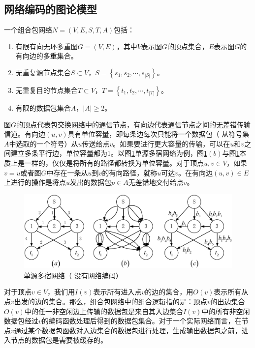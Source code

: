 \subsection{网络编码的图论模型}
一个组合包网络$N=(V,E,S,T,A)$包括：
\begin{enumerate}[fullwidth,itemindent=2em,label=(\arabic*)]
	\item 有限有向无环多重图$G=(V,E)$，其中$V$表示图$G$的顶点集合，$E$表示图$G$的有向边的多重集合。
	\item 无重复源节点集合$S \subset V$，$S = \left\{ {{s_1},{s_2}, \cdots ,{s_{\left| S \right|}}} \right\}$。
	\item 无重复目的节点集合$T \subset V$，$T = \left\{ {{t_1},{t_2}, \cdots ,{t_{\left| T \right|}}} \right\}$。
	\item 有限的数据包集合$A$，$\left| A \right| \ge 2$。
\end{enumerate}
\par
图$G$的顶点代表包交换网络中的通信节点，有向边代表通信节点之间的无差错传输信道。有向边$(u,v)$具有单位容量，即每条边每次只能将一个数据包（ 从符号集$A$中选取的一个符号）从$u$传送给点$v$。如果要进行更大容量的传输，可以在$u$和$v$之间建立多条平行边，单位容量都为1。以图\ref{TULUNMOXING_EPS}单源多宿网络为例，图\ref{TULUNMOXING_EPS}$\left(b\right)$与图\ref{TULUNMOXING_EPS}本质上是一样的，仅仅是将所有的路径都转换为单位容量。对于顶点$u,v \in V$，如果$v=u$或者图$G$中存在一条从$u$到$v$的有向路径，就称$u$可达$v$。在有向边$\left(u,v\right) \in E$上进行的操作是将点$u$发出的数据包$p \in A$无差错地交付给点$v$。
\begin{figure}[htbp]
	\centering
	\includegraphics[width=6in]{figures/tulunmoxing.eps}
	\caption{单源多宿网络（ 没有网络编码）}
	\label{TULUNMOXING_EPS}
\end{figure}
\par
对于顶点$v \in V$，我们用$I\left( v \right)$表示所有进入点$v$的边的集合，用$O\left( v \right)$表示所有从点$v$出发的边的集合。那么，组合包网络中的组合逻辑指的是：顶点$v$的出边集合$O\left( v \right)$中的任一非空闲边上传输的数据包是来自其入边集合$I\left( v \right)$中的所有非空闲数据包经过$v$的编码函数处理后得到的数据包集合。对于一个实际网络而言，在节点$v$通过某个数据包函数对入边集合的数据包进行处理，生成输出数据包之前，进入节点的数据包是需要被缓存的。
